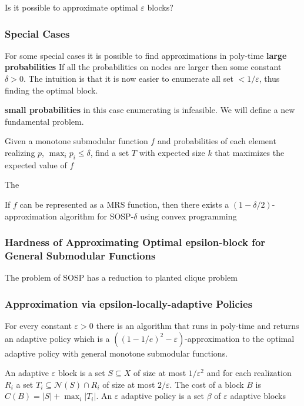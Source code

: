 Is it possible to approximate optimal $\varepsilon$ blocks?

\subsubsection{Special Cases}
For some special cases it is possible to find approximations in poly-time
\textbf{large probabilities}
If all the probabilities on nodes are larger then some constant $\delta >0$. The intuition is that it is now  easier to enumerate all set $<1/\varepsilon$, thus finding the optimal block.

\textbf{small probabilities} in this case enumerating is infeasible. We will define a new fundamental problem.

\begin{definition}
Given a monotone submodular function $f$ and probabilities of each element realizing $p$, $\max_i{p_i}\le \delta$, find a set $T$ with expected size $k$ that maximizes the expected value of $f$

\end{definition} 
The 
\begin{theorem}
If $f$ can be represented as a MRS function, then there exists a $(1-\delta/2)$-approximation algorithm for SOSP-$\delta$ using convex programming 
\end{theorem}

\subsubsection{Hardness of Approximating Optimal epsilon-block for General Submodular Functions}
The problem of SOSP has a reduction to planted clique problem
\subsubsection{Approximation via epsilon-locally-adaptive Policies}
\begin{theorem}
For every constant $\varepsilon>0$ there is an algorithm that runs in poly-time and returns an adaptive policy which is a $((1-1/e)^2-\varepsilon)$-approximation to the optimal adaptive policy with general monotone submodular functions. 
\end{theorem}
\begin{definition}
An adaptive $\varepsilon$ block is a set $S\subseteq X$ of size at most $1/\varepsilon^2$ and for each realization $R_i$ a set $T_i\subseteq\mathcal{N}(S)\cap R_i$ of size at most $2/\varepsilon$. The cost of a block $B$ is $C(B)=|S|+\max_i{|T_i|}$. An $\varepsilon$ adaptive policy is a set $\beta$ of $\varepsilon$ adaptive blocks
\end{definition}

